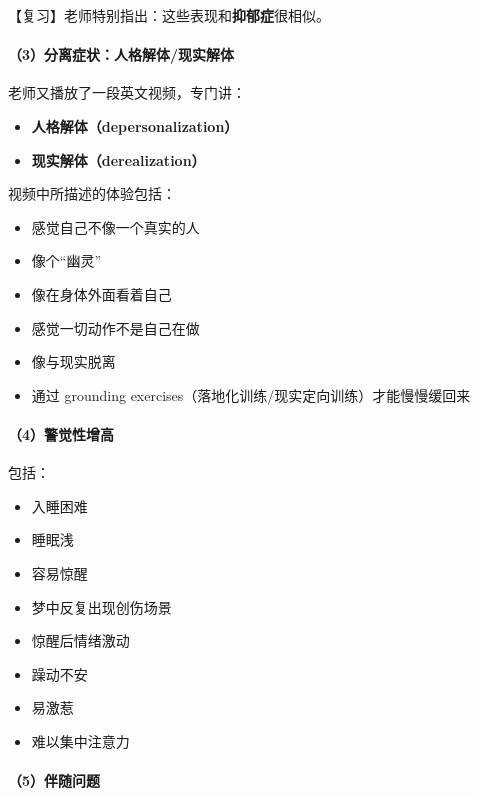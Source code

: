 \documentclass[
  chinese,
  9pt,
  a4paper,
]{ctexart}
\providecommand{\tightlist}{%
  \setlength{\itemsep}{0pt}\setlength{\parskip}{0pt}}
\begin{document}
【复习】老师特别指出：这些表现和\textbf{抑郁症}很相似。

\paragraph{（3）分离症状：人格解体/现实解体}\label{ux5206ux79bbux75c7ux72b6ux4ebaux683cux89e3ux4f53ux73b0ux5b9eux89e3ux4f53}

老师又播放了一段英文视频，专门讲：

\begin{itemize}
\tightlist
\item
  \textbf{人格解体（depersonalization）}
\item
  \textbf{现实解体（derealization）}
\end{itemize}

视频中所描述的体验包括：

\begin{itemize}
\tightlist
\item
  感觉自己不像一个真实的人
\item
  像个``幽灵''
\item
  像在身体外面看着自己
\item
  感觉一切动作不是自己在做
\item
  像与现实脱离
\item
  通过 grounding exercises（落地化训练/现实定向训练）才能慢慢缓回来
\end{itemize}

\paragraph{（4）警觉性增高}\label{ux8b66ux89c9ux6027ux589eux9ad8}

包括：

\begin{itemize}
\tightlist
\item
  入睡困难
\item
  睡眠浅
\item
  容易惊醒
\item
  梦中反复出现创伤场景
\item
  惊醒后情绪激动
\item
  躁动不安
\item
  易激惹
\item
  难以集中注意力
\end{itemize}

\paragraph{（5）伴随问题}\label{ux4f34ux968fux95eeux9898}
\end{document}
